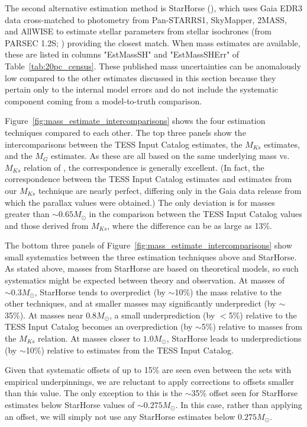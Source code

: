 \documentclass[twocolumn,tighten,twocolappendix]{aastex631}
\begin{document}
The second alternative estimation method is StarHorse (\citealt{anders2022}), which uses Gaia EDR3 data cross-matched to photometry from Pan-STARRS1, SkyMapper, 2MASS, and AllWISE to estimate stellar parameters from stellar isochrones (from PARSEC 1.2S; \citealt{marigo2017}) providing the closest match. When \cite{anders2022} mass estimates are available, these are listed in columns "EstMassSH" and "EstMassSHErr" of Table~\ref{tab:20pc_census}. These published mass uncertainties can be anomalously low compared to the other estimates discussed in this section because they pertain only to the internal model errors and do not include the systematic component coming from a model-to-truth comparison.

Figure~\ref{fig:mass_estimate_intercomparisons} shows the four estimation techniques compared to each other. The top three panels show the intercomparisons between the TESS Input Catalog estimates, the $M_{Ks}$ estimates, and the $M_G$ estimates. As these are all based on the same underlying mass vs.\ $M_{Ks}$ relation of \cite{mann2019}, the correspondence is generally excellent. (In fact, the correspondence between the TESS Input Catalog estimates and estimates from our $M_{Ks}$ technique are nearly perfect, differing only in the Gaia data release from which the parallax values were obtained.) The only deviation is for masses greater than $\sim0.65 M_\odot$ in the comparison between the TESS Input Catalog values and those derived from $M_{Ks}$, where the difference can be as large as 13\%.

The bottom three panels of Figure~\ref{fig:mass_estimate_intercomparisons} show small systematics between the three estimation techniques above and StarHorse. As stated above, masses from StarHorse are based on theoretical models, so such systematics might be expected between theory and observation. At masses of $\sim0.3 M_\odot$, StarHorse tends to overpredict (by $\sim$10\%) the mass relative to the other techniques, and at smaller masses may significantly underpredict (by $\sim$35\%). At masses near $0.8 M_\odot$, a small underprediction (by $<$5\%) relative to the TESS Input Catalog becomes an overprediction (by $\sim$5\%) relative to masses from the $M_{Ks}$ relation. At masses closer to $1.0 M_\odot$, StarHorse leads to underpredictions (by $\sim$10\%) relative to estimates from the TESS Input Catalog.

Given that systematic offsets of up to 15\% are seen even between the sets with empirical underpinnings, we are reluctant to apply corrections to offsets smaller than this value. The only exception to this is the $\sim$35\% offset seen for StarHorse estimates below StarHorse values of $\sim0.275 M_\odot$. In this case, rather than applying an offset, we will simply not use any StarHorse estimates below $0.275 M_\odot$.
\end{document}
